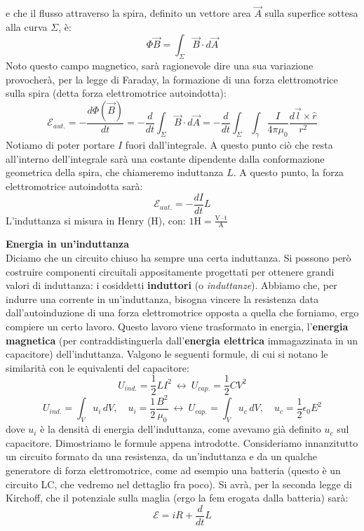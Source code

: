 \documentclass[a4paper,12pt]{article}
\begin{document}
e che il flusso attraverso la spira, definito un vettore area $\vec{A}$ sulla superfice sottesa alla curva $\Sigma$, è:
$$ \Phi{\vec{B}} = \int_\Sigma \vec{B} \cdot d\vec{A} $$
Noto questo campo magnetico, sarà ragionevole dire una sua variazione provocherà, per la legge di Faraday, la formazione di una forza elettromotrice sulla spira (detta forza elettromotrice autoindotta):
$$ \mathcal{E}_{aut.} = -\frac{d\Phi(\vec{B})}{dt} = -\frac{d}{dt} \int_\Sigma \vec{B} \cdot d\vec{A} = -\frac{d}{dt} \int_\Sigma \int_\gamma \frac{I}{4\pi\mu_0} \frac{d\vec{l} \times \hat{r}}{r^2} $$
Notiamo di poter portare $I$ fuori dall'integrale. A questo punto ciò che resta all'interno dell'integrale sarà una costante dipendente dalla conformazione geometrica della spira, che chiameremo
induttanza $L$. A questo punto, la forza elettromotrice autoindotta sarà:
$$ \mathcal{E}_{aut.} = -\frac{dI}{dt}L $$
L'induttanza si misura in Henry (H), con: $ 1 \mathrm{H} = \frac{\mathrm{V} \cdot \mathrm{t}}{\mathrm{A}} $
\par\smallskip
\textbf{Energia in un'induttanza} \\
Diciamo che un circuito chiuso ha sempre una certa induttanza. Si possono però costruire componenti circuitali appositamente progettati per ottenere grandi valori di induttanza: i cosiddetti \textbf{induttori} (o \textit{induttanze}).
Abbiamo che, per indurre una corrente in un'induttanza, bisogna vincere la resistenza data dall'autoinduzione di una forza elettromotrice opposta a quella che forniamo, ergo compiere un certo lavoro. Questo lavoro viene trasformato
in energia, l'\textbf{energia magnetica} (per contraddistinguerla dall'\textbf{energia elettrica} immagazzinata in un capacitore) dell'induttanza. Valgono le seguenti formule, di cui si notano le similarità con le equivalenti
del capacitore:
$$ U_{ind.} = \frac{1}{2}LI^2 \  \leftrightarrow \  U_{cap.} = \frac{1}{2}CV^2 $$
$$ U_{ind.} = \int_V u_i \, dV, \quad u_i = \frac{1}{2} \frac{B^2}{\mu_0} \ \leftrightarrow \ U_{cap.} = \int_V u_c \, dV, \quad u_c = \frac{1}{2} \epsilon_0 E^2 $$
dove $u_i$ è la densità di energia dell'induttanza, come avevamo già definito $u_c$ sul capacitore. Dimostriamo le formule appena introdotte. Consideriamo innanzitutto un circuito formato da una resistenza,
da un'induttanza e da un qualche generatore di forza elettromotrice, come ad esempio una batteria (questo è un circuito LC, che vedremo nel dettaglio fra poco). Si avrà, per la seconda legge di Kirchoff, che il potenziale sulla maglia (ergo la fem erogata
dalla batteria) sarà:
$$ \mathcal{E} = iR + \frac{d}{dt}L $$
\end{document}
